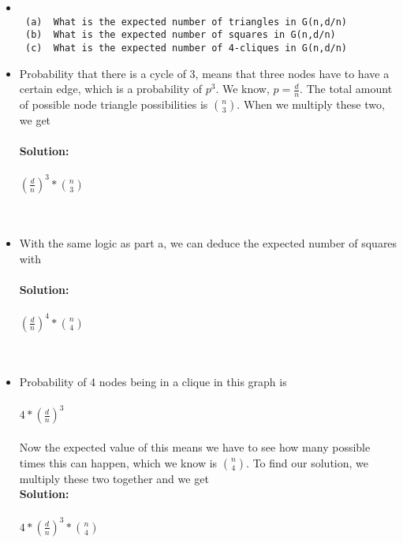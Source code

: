 \documentclass[ruled]{article}
\begin{document}
\begin{itemize}
\item[Q3]
\begin{verbatim}

 (a)  What is the expected number of triangles in G(n,d/n)
 (b)  What is the expected number of squares in G(n,d/n)
 (c)  What is the expected number of 4-cliques in G(n,d/n)

\end{verbatim}

\item[(a)] Probability that there is a cycle of 3, means that three nodes have to have a certain edge, which is a probability of $p^3$.  We know, $p = \frac{d}{n}$.  The total amount of possible node triangle possibilities is $n \choose 3$.  When we multiply these two, we get \\ \\
\textbf{Solution: }\\ \\
{\LARGE $(\frac{d}{n}) ^3 * {n \choose 3}$ }\\
\\ \\
\item[(b)] With the same logic as part a, we can deduce the expected number of squares with \\ \\
\textbf{Solution: } \\ \\
{\LARGE $(\frac{d}{n}) ^4 * {n \choose 4}$ }\\
\\ \\
\item[(c)]   Probability of 4 nodes being in a clique in this graph is \\ \\

{\LARGE $4 * (\frac{d}{n})^{3} $ }
\\ \\
Now the expected value of this means we have to see how many possible times this can happen, which we know is {\Large $n \choose 4$}.  To find our solution, we multiply these two together and we get \\ 

\textbf{Solution: } \\ \\
{\LARGE $4 * (\frac{d}{n})^{3} *{n \choose 4}$}
\end{itemize}
\end{document}
